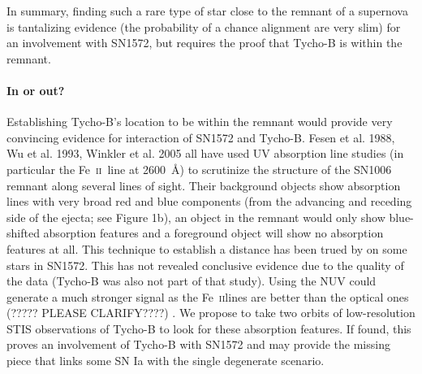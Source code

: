 \documentclass[12pt]{article}
\newcommand{\feii}{Fe~\textsc{ii}}
\begin{document}
In summary, finding such a rare type of star close to the remnant of a supernova is tantalizing evidence (the probability of a chance alignment are very slim) for an involvement with SN1572, but requires the proof that Tycho-B is within the remnant.

\vspace{-5mm}
\paragraph{In or out?}
Establishing Tycho-B's location to be within the remnant would provide very convincing evidence for interaction of SN1572 and Tycho-B. 
Fesen et al. 1988, Wu et al. 1993, Winkler et al. 2005 all have used UV absorption line studies (in particular the \feii\ line at 2600~\AA) to scrutinize the structure of the SN1006 remnant along several lines of sight. Their background objects show absorption lines with very broad red and blue components (from the advancing and receding side of the ejecta; see Figure 1b), an object in the remnant would only show blue-shifted absorption features and a foreground object will show no absorption features at all. This technique to establish a distance has been trued by \citet{2007PASJ...59..811I} on some stars in SN1572. This has not revealed conclusive evidence due to the quality of the data (Tycho-B was also not part of that study). Using the NUV could generate a much stronger signal as the \feii lines are better than the optical ones (????? PLEASE CLARIFY????) . We propose to take two orbits of low-resolution STIS observations of Tycho-B to look for these absorption features. If found,  this proves an involvement of Tycho-B with SN1572 and may provide the missing piece that links some SN Ia with the single degenerate scenario.
\end{document}
